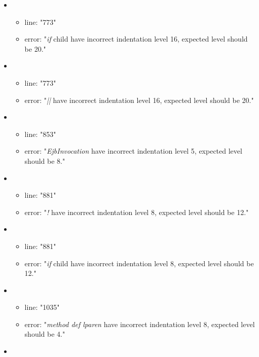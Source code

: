 
\begin{itemize}
\subsection{Indentation} %
\label{sub:indention}
	\item 
	\begin{itemize} 
		\item line: "773" 
		\item error: "\emph{if} child have incorrect indentation level 16, expected level should be 20." 
	\end{itemize}
	\item 
	\begin{itemize} 
		\item line: "773" 
		\item error: "\emph{||} have incorrect indentation level 16, expected level should be 20." 
	\end{itemize}
	\item 
	\begin{itemize} 
		\item line: "853" 
		\item error: "\emph{EjbInvocation} have incorrect indentation level 5, expected level should be 8." 
	\end{itemize}
	\item 
	\begin{itemize} 
		\item line: "881" 
		\item error: "\emph{!} have incorrect indentation level 8, expected level should be 12." 
	\end{itemize}
	\item 
	\begin{itemize} 
		\item line: "881" 
		\item error: "\emph{if} child have incorrect indentation level 8, expected level should be 12." 
	\end{itemize}
	\item 
	\begin{itemize} 
		\item line: "1035" 
		\item error: "\emph{method def lparen} have incorrect indentation level 8, expected level should be 4." 
	\end{itemize}
	\item 
	\begin{itemize} 

\end{itemize}
\end{itemize}
